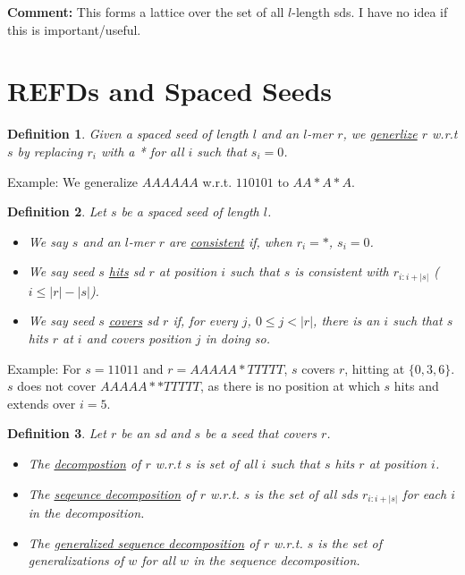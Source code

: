 \documentclass{article}
\newcommand{\und}{\underline}
\newtheorem{definition}{Definition}
\begin{document}
{\bf Comment:} This forms a lattice over the set of all
$l$-length sds.  I have no idea if this is important/useful.

\section{REFDs and Spaced Seeds}

\begin{definition}
Given a spaced seed of length $l$ and an $l$-mer $r$, we
\und{generlize} $r$
w.r.t $s$ by replacing $r_i$ with a * for all $i$ such that $s_i = 0$.
\end{definition}
Example: We generalize $AAAAAA$ w.r.t. $110101$ to $AA*A*A$.

\begin{definition}
  Let $s$ be a spaced seed of length $l$.
 
  \begin{itemize}
  \item We say $s$ and an $l$-mer $r$ are \und{consistent} if, when $r_i = *$, $s_i=0$.
  \item We say seed $s$ \und{hits} sd $r$ at position $i$ such that
    $s$ is consistent with $r_{i:i+|s|}$ ($i \leq |r| - |s|$).
  \item We say seed $s$ \und{covers} sd $r$ if, for every $j$, $0 \leq
    j < |r|$, there is an $i$ such that $s$ hits $r$ at $i$ and covers
    position $j$ in doing so.
  \end{itemize}
\end{definition}

Example: For $s=11011$ and $r=AAAAA*TTTTT$, $s$ covers $r$, hitting at
$\{0,3,6\}$.  $s$ does not cover $AAAAA**TTTTT$, as there is no
position at which $s$ hits and extends over $i=5$.

\begin{definition}
  Let $r$ be an sd and $s$ be a seed that covers $r$.
\begin{itemize}
\item The \und{decompostion} of $r$ w.r.t $s$ is set of all $i$ such
  that $s$ hits $r$ at position $i$.
\item The \und{seqeunce decomposition} of $r$ w.r.t. $s$ is the set
  of all sds $r_{i:i+|s|}$ for each $i$ in the decomposition.
\item The \und{generalized sequence decomposition} of $r$ w.r.t. $s$
  is the set of generalizations of $w$ for all $w$ in the sequence decomposition.
\end{itemize}
\end{definition}
  
\end{document}
